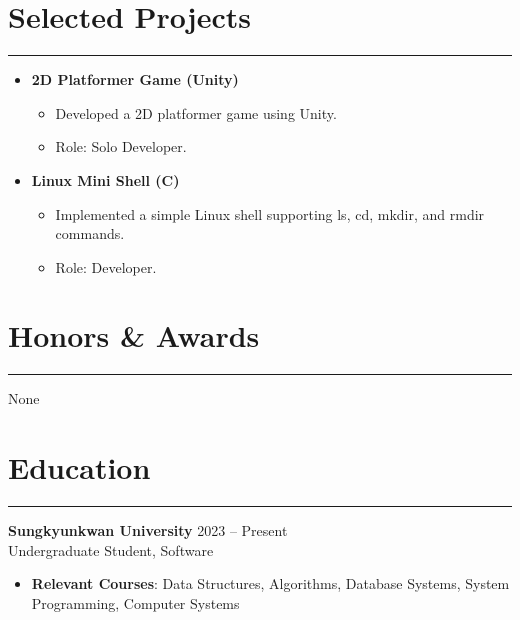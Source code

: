 \documentclass[letterpaper, 10pt]{article}
\begin{document}
\section*{Selected Projects}
\hrule
\vspace{4pt}
\begin{itemize}
    \item \textbf{2D Platformer Game (Unity)}
    \begin{itemize}
        \item Developed a 2D platformer game using Unity.
        \item Role: Solo Developer.
    \end{itemize}

    \item \textbf{Linux Mini Shell (C)}
    \begin{itemize}
        \item Implemented a simple Linux shell supporting ls, cd, mkdir, and rmdir commands.
        \item Role: Developer.
    \end{itemize}
\end{itemize}
\section*{Honors \& Awards}
\hrule
\vspace{4pt}
None
\section*{Education}
\hrule
\vspace{4pt}
\textbf{Sungkyunkwan University} \hfill 2023 -- Present \\
Undergraduate Student, Software
\begin{itemize}
    \item \textbf{Relevant Courses}: Data Structures, Algorithms,
    Database Systems, System Programming, Computer Systems
\end{itemize}
\end{document}
